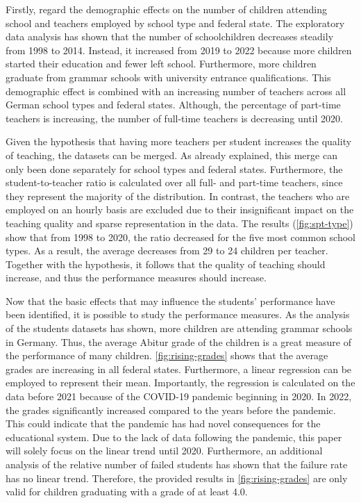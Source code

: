 Firstly, regard the demographic effects on the number of children attending school and teachers employed by school type and federal state. The exploratory data analysis has shown that the number of schoolchildren decreases steadily from 1998 to 2014. Instead, it increased from 2019 to 2022 because more children started their education and fewer left school. Furthermore, more children graduate from grammar schools with university entrance qualifications. This demographic effect is combined with an increasing number of teachers across all German school types and federal states. Although, the percentage of part-time teachers is increasing, the number of full-time teachers is decreasing until 2020.

Given the hypothesis that having more teachers per student increases the quality of teaching, the datasets can be merged. As already explained, this merge can only been done separately for school types and federal states. Furthermore, the student-to-teacher ratio is calculated over all full- and part-time teachers, since they represent the majority of the distribution. In contrast, the teachers who are employed on an hourly basis are excluded due to their insignificant impact on the teaching quality and sparse representation in the data. The results (\autoref{fig:spt-type}) show that from 1998 to 2020, the ratio decreased for the five most common school types. As a result, the average decreases from 29 to 24 children per teacher. Together with the hypothesis, it follows that the quality of teaching should increase, and thus the performance measures should increase.





Now that the basic effects that may influence the students' performance have been identified, it is possible to study the performance measures. As the analysis of the students datasets has shown, more children are attending grammar schools in Germany. Thus, the average Abitur grade of the children is a great measure of the performance of many children. \autoref{fig:rising-grades} shows that the average grades are increasing in all federal states. Furthermore, a linear regression can be employed to represent their mean. Importantly, the regression is calculated on the data before 2021 because of the COVID-19 pandemic beginning in 2020. In 2022, the grades significantly increased compared to the years before the pandemic. This could indicate that the pandemic has had novel consequences for the educational system. Due to the lack of data following the pandemic, this paper will solely focus on the linear trend until 2020. Furthermore, an additional analysis of the relative number of failed students has shown that the failure rate has no linear trend. Therefore, the provided results in \autoref{fig:rising-grades} are only valid for children graduating with a grade of at least 4.0.

